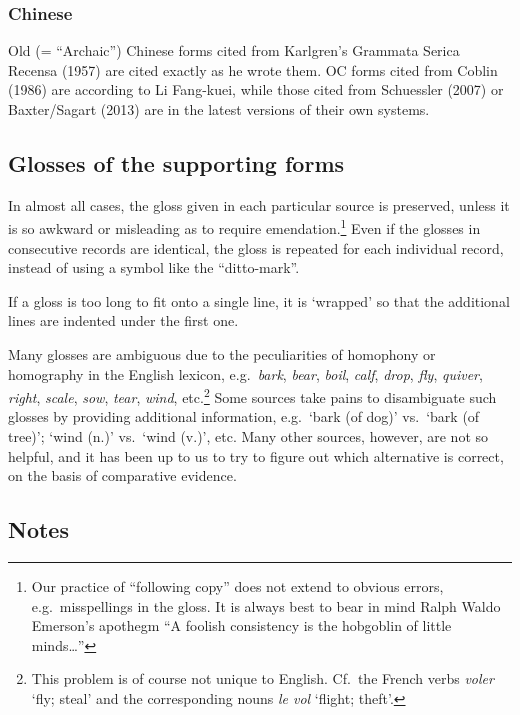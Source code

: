\subsubsection{Chinese}

Old (= “Archaic”) Chinese forms cited from Karlgren’s Grammata Serica Recensa (1957) are cited exactly as he wrote them. OC forms cited from Coblin (1986) are according to Li Fang-kuei, while those cited from Schuessler (2007) or Baxter/Sagart (2013) are in the latest versions of their own systems.

\subsection{Glosses of the supporting forms}

In almost all cases, the gloss given in each particular source is preserved,
unless it is so awkward or misleading as to require emendation.\footnote{Our practice of “following copy” does not extend to obvious errors, e.g.\ misspellings in the gloss. It is always best to bear in mind Ralph Waldo Emerson’s apothegm “A foolish consistency is the hobgoblin of little minds…”} Even if the
glosses in consecutive records are identical, the gloss is repeated for each
individual record, instead of using a symbol like the “ditto-mark”.

If a gloss is too long to fit onto a single line, it is ‘wrapped’ so that
the additional lines are indented under the first one.


Many glosses are ambiguous due to the peculiarities of homophony or homography in the English lexicon, e.g.\ \textit{bark}, \textit{bear}, \textit{boil}, \textit{calf}, \textit{drop}, \textit{fly}, \textit{quiver}, \textit{right}, \textit{scale}, \textit{sow}, \textit{tear}, \textit{wind}, etc.\footnote{This problem is of course not unique to English. Cf.\ the French verbs \textit{voler} ‘fly; steal’ and the corresponding nouns \textit{le vol} ‘flight; theft’.} Some sources take pains to disambiguate such glosses by providing additional information, e.g.\ ‘bark (of dog)’ vs.\ ‘bark (of tree)’; ‘wind (n.)’ vs.\ ‘wind (v.)’, etc. Many other sources, however, are not so helpful, and it has been up to us to try to figure out which alternative is correct, on the basis of comparative evidence.

\subsection{Notes}

